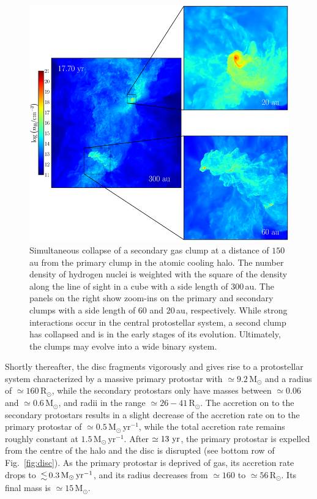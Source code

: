\documentclass[useAMS,usenatbib]{mnras}
\newcommand{\msunyr}{\text{M}_\odot\,\text{yr}^{-1}}
\newcommand{\msun}{\text{M}_\odot}
\newcommand{\rsun}{\text{R}_\odot}
\begin{document}
\begin{figure}
\begin{center}
\includegraphics[scale=0.82]{./f10.png}
\caption{Simultaneous collapse of a secondary gas clump at a distance of $150\,$au from the primary clump in the atomic cooling halo. The number density of hydrogen nuclei is weighted with the square of the density along the line of sight in a cube with a side length of $300\,$au. The panels on the right show zoom-ins on the primary and secondary clumps with a side length of 60 and $20\,$au, respectively. While strong interactions occur in the central protostellar system, a second clump has collapsed and is in the early stages of its evolution. Ultimately, the clumps may evolve into a wide binary system.}
\label{fig:box}
\end{center}
\end{figure}

Shortly thereafter, the disc fragments vigorously and gives rise to a protostellar system characterized by a massive primary protostar with $\simeq 9.2\,\msun$ and a radius of $\simeq 160\,\rsun$, while the secondary protostars only have masses between $\simeq 0.06$ and $\simeq 0.6\,\msun$, and radii in the range $\simeq 26 - 41\,\rsun$. The accretion on to the secondary protostars results in a slight decrease of the accretion rate on to the primary protostar of $\simeq 0.5\,\msunyr$, while the total accretion rate remains roughly constant at $1.5\,\msunyr$. After $\simeq 13~{\rm yr}$, the primary protostar is expelled from the centre of the halo and the disc is disrupted (see bottom row of Fig.~\ref{fig:disc}). As the primary protostar is deprived of gas, its accretion rate drops to $\la 0.3\,\msunyr$, and its radius decreases from $\simeq 160$ to $\simeq 56\,\rsun$. Its final mass is $\simeq 15\,\msun$.
\end{document}
